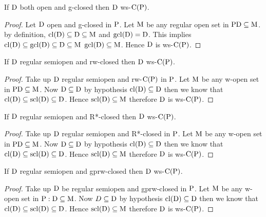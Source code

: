 \begin{thm}\label{thm2.2.43}
If $\mathrm{D}$ both open and g-closed then $\mathrm{D}$ ws-$\mathrm{C}(\mathrm{P})$.
\end{thm}

\begin{proof}
Let $\mathrm{D}$ open and g-closed in $\mathrm{P}$. Let $\mathrm{M}$ be any regular open set in $\mathrm{P} \mathrm{D}\subseteq \mathrm{M}$. by definition, $\mathrm{cl}(\mathrm{D})\subseteq \mathrm{D}\subseteq \mathrm{M}$ and $\mathrm{gcl}(\mathrm{D})=\mathrm{D}$. This implies $\mathrm{cl}(\mathrm{D})\subseteq \mathrm{gcl}(\mathrm{D}) \subseteq \mathrm{D}\subseteq \mathrm{M}$ $\mathrm{gcl}(\mathrm{D})\subseteq \mathrm{M}$. Hence $\mathrm{D}$ is ws-$\mathrm{C}(\mathrm{P})$.
\end{proof}

\begin{thm}\label{thm2.2.44}
If $\mathrm{D}$ regular semiopen and rw-closed then $\mathrm{D}$ ws-$\mathrm{C}(\mathrm{P})$.
\end{thm}

\begin{proof}
Take up $\mathrm{D}$ regular semiopen and rw-$\mathrm{C}(\mathrm{P})$ in $\mathrm{P}$. Let $\mathrm{M}$ be any w-open set in $\mathrm{P} \mathrm{D}\subseteq \mathrm{M}$. Now $\mathrm{D}\subseteq \mathrm{D}$ by hypothesis $\mathrm{cl}(\mathrm{D})\subseteq \mathrm{D}$ then we know that $\mathrm{cl}(\mathrm{D}) \subseteq \mathrm{scl}(\mathrm{D})\subseteq \mathrm{D}$. Hence $\mathrm{scl}(\mathrm{D})\subseteq \mathrm{M}$ therefore $\mathrm{D}$ is ws-$\mathrm{C}(\mathrm{P})$.
\end{proof}

\begin{thm}\label{thm2.2.45}
If $\mathrm{D}$ regular semiopen and R*-closed then $\mathrm{D}$ ws-$\mathrm{C}(\mathrm{P})$.
\end{thm}

\begin{proof}
Take up $\mathrm{D}$ regular semiopen and R*-closed in $\mathrm{P}$. Let $\mathrm{M}$ be any w-open set in $\mathrm{P} \mathrm{D}\subseteq \mathrm{M}$. Now $\mathrm{D}\subseteq \mathrm{D}$ by hypothesis $\mathrm{cl}(\mathrm{D})\subseteq \mathrm{D}$ then we know that $\mathrm{cl}(\mathrm{D}) \subseteq \mathrm{scl}(\mathrm{D})\subseteq \mathrm{D}$. Hence $\mathrm{scl}(\mathrm{D})\subseteq \mathrm{M}$ therefore $\mathrm{D}$ is ws-$\mathrm{C}(\mathrm{P})$.
\end{proof}

\begin{thm}\label{thm2.2.46}
If $\mathrm{D}$ regular semiopen and gprw-closed then $\mathrm{D}$ ws-$\mathrm{C}(\mathrm{P})$.
\end{thm}

\begin{proof}
Take up $\mathrm{D}$ be regular semiopen and gprw-closed in $\mathrm{P}$. Let $\mathrm{M}$ be any w-open set in $\mathrm{P} : \mathrm{D}\subseteq \mathrm{M}$. Now $D\subseteq \mathrm{D}$ by hypothesis $\mathrm{cl}(\mathrm{D})\subseteq \mathrm{D}$ then we know that $\mathrm{cl}(\mathrm{D}) \subseteq \mathrm{scl}(\mathrm{D})\subseteq \mathrm{D}$. Hence $\mathrm{scl}(\mathrm{D})\subseteq \mathrm{M}$ therefore $\mathrm{D}$ is ws-$\mathrm{C}(\mathrm{P})$.
\end{proof}

